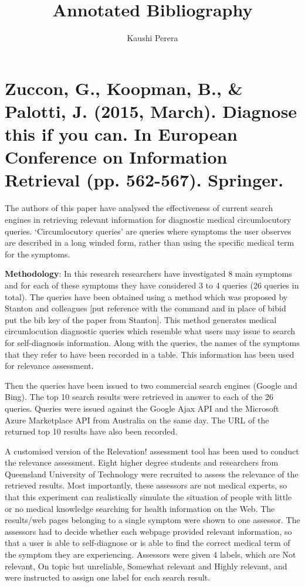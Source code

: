 \documentclass[]{article}
\title{Annotated Bibliography}
\author{Kaushi Perera}
\begin{document}
\maketitle


\section{Zuccon, G., Koopman, B., \& Palotti, J. (2015, March). Diagnose this if you can. In European Conference on Information Retrieval (pp. 562-567). Springer.}

The authors of this paper have analysed the effectiveness of current search engines in retrieving relevant information for diagnostic medical circumlocutory queries. ‘Circumlocutory queries’ are queries where symptoms the user observes are described in a long winded form, rather than using the specific medical term for the symptoms. 
 
\textbf{Methodology}: In this research researchers have investigated 8 main symptoms and for each of these symptoms they have considered 3 to 4 queries (26 queries in total). The queries have been obtained using a method which was proposed by Stanton and colleagues [put reference with the command \cite{bibid} and in place of bibid put the bib key of the paper from Stanton]. This method generates medical circumlocution diagnostic queries which resemble what users may issue to search for self-diagnosis information. Along with the queries, the names of the symptoms that they refer to have been recorded in a table. This information has been used for relevance assessment.
 
Then the queries have been issued to two commercial search engines (Google and Bing). The top 10 search results were retrieved in answer to each of the 26 queries. Queries were issued against the Google Ajax API and the Microsoft Azure Marketplace API from Australia on the same day. The URL of the returned top 10 results have also been recorded. 

A customised version of the Relevation! assessment tool has been used to conduct the relevance assessment. Eight higher degree students and researchers from Queensland University of Technology were recruited to assess the relevance of the retrieved results. Most importantly, these assessors are not medical experts, so that this experiment can realistically simulate the situation of people with little or no medical knowledge searching for health information on the Web. The results/web pages belonging to a single symptom were shown to one assessor. The assessors had to decide whether each webpage provided relevant information, so that a user is able to self-diagnose or is able to find the correct medical term of the symptom they are experiencing. Assessors were given 4 labels, which are Not relevant, On topic but unreliable, Somewhat relevant and Highly relevant, and were instructed to assign one label for each search result. 
\end{document}
